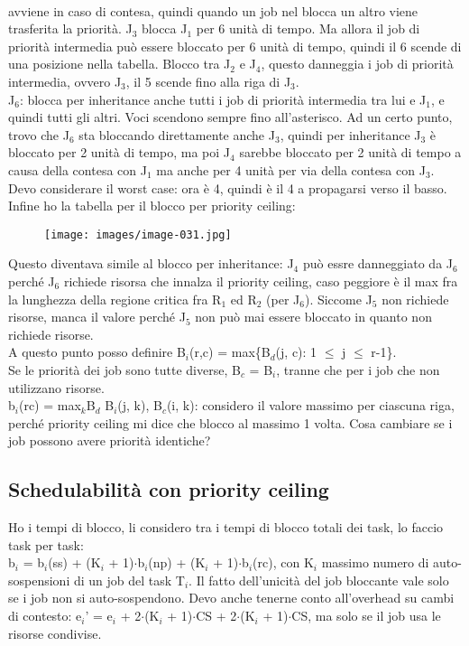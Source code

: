 \documentclass[12pt, oneside]{extbook}
\begin{document}
\\avviene in caso di contesa, quindi quando un job nel blocca un altro viene trasferita la priorità. J$_{3}$ blocca J$_{1}$ per 6 unità di tempo. Ma allora il job di priorità intermedia può essere bloccato per 6 unità di tempo, quindi il 6 scende di una posizione nella tabella. Blocco tra J$_{2}$ e J$_{4}$, questo danneggia i job di priorità intermedia, ovvero J$_{3}$, il 5 scende fino alla riga di J$_{3}$.\\ J$_{6}$: blocca per inheritance anche tutti i job di priorità intermedia tra lui e J$_{1}$, e quindi tutti gli altri. Voci scendono sempre fino all'asterisco. Ad un certo punto, trovo che J$_{6}$ sta bloccando direttamente anche J$_{3}$, quindi per inheritance J$_{3}$ è bloccato per 2 unità di tempo, ma poi J$_{4}$ sarebbe bloccato per 2 unità di tempo a causa della contesa con J$_{1}$ ma anche per 4 unità per via della contesa con J$_{3}$. Devo considerare il worst case: ora è 4, quindi è il 4 a propagarsi verso il basso.\\ Infine ho la tabella per il blocco per priority ceiling:\\
\begin{figure}[!h]
\centering
\texttt{[image: images/image-031.jpg]}
\end{figure}
Questo diventava simile al blocco per inheritance: J$_{4}$ può essre danneggiato da J$_{6}$ perché J$_{6}$ richiede risorsa che innalza il priority ceiling, caso peggiore è il max fra la lunghezza della regione critica fra R$_{1}$ ed R$_{2}$ (per J$_{6}$). Siccome J$_{5}$ non richiede risorse, manca il valore perché J$_{5}$ non può mai essere bloccato in quanto non richiede risorse.\\ A questo punto posso definire B$_{i}$(r,c) = max\{B$_{d}$(j, c): 1 $\leq$ j $\leq$ r-1\}.\\ Se le priorità dei job sono tutte diverse, B$_{c}$ = B$_{i}$, tranne che per i job che non utilizzano risorse.\\ b$_{i}$(rc) = max$_{k}${B$_{d}$ B$_{i}$(j, k), B$_{c}$(i, k)}: considero il valore massimo per ciascuna riga, perché priority ceiling mi dice che blocco al massimo 1 volta. Cosa cambiare se i job possono avere priorità identiche?
\subsection{Schedulabilità con priority ceiling}
Ho i tempi di blocco, li considero tra i tempi di blocco totali dei task, lo faccio task per task:\\
b$_{i}$ = b$_{i}$(ss) + (K$_{i}$ + 1)$\cdot$b$_{i}$(np) + (K$_{i}$ + 1)$\cdot$b$_{i}$(rc), con K$_{i}$ massimo numero di auto-sospensioni di un job del task T$_{i}$. Il fatto dell'unicità del job bloccante vale solo se i job non si auto-sospendono. Devo anche tenerne conto all'overhead su cambi di contesto: e$_{i}$' = e$_{i}$ + 2$\cdot$(K$_{i}$ + 1)$\cdot$CS + 2$\cdot$(K$_{i}$ + 1)$\cdot$CS, ma solo se il job usa le risorse condivise.
\end{document}

